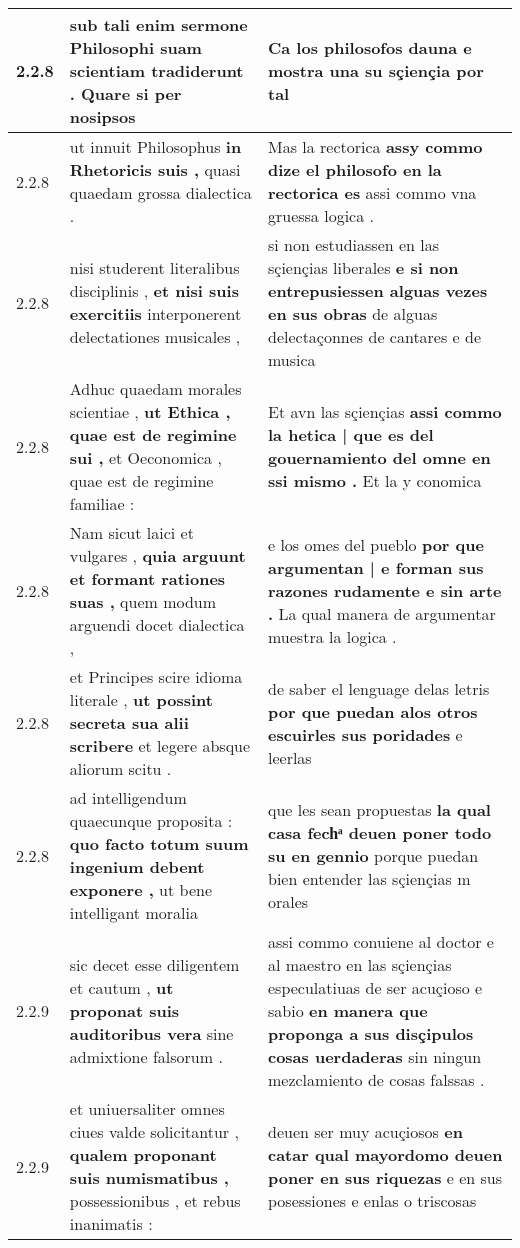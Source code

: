 \begin{tabular}{|p{1cm}|p{6.5cm}|p{6.5cm}|}
2.2.8 & sub tali enim sermone Philosophi \textbf{ suam scientiam tradiderunt . } Quare si per nosipsos & Ca los philosofos dauna \textbf{ e mostra una su sçiençia } por tal \\\hline
2.2.8 & ut innuit Philosophus \textbf{ in Rhetoricis suis , } quasi quaedam grossa dialectica . & Mas la rectorica \textbf{ assy commo dize el philosofo en la rectorica es } assi commo vna gruessa logica . \\\hline
2.2.8 & nisi studerent literalibus disciplinis , \textbf{ et nisi suis exercitiis } interponerent delectationes musicales , & si non estudiassen en las sçiençias liberales \textbf{ e si non entrepusiessen alguas vezes en sus obras } de alguas delectaçonnes de cantares e de musica \\\hline
2.2.8 & Adhuc quaedam morales scientiae , \textbf{ ut Ethica , quae est de regimine sui , } et Oeconomica , quae est de regimine familiae : & Et avn las sçiençias \textbf{ assi commo la hetica | que es del gouernamiento del omne en ssi mismo . } Et la y conomica \\\hline
2.2.8 & Nam sicut laici et vulgares , \textbf{ quia arguunt et formant rationes suas , } quem modum arguendi docet dialectica , & e los omes del pueblo \textbf{ por que argumentan | e forman sus razones rudamente e sin arte . } La qual manera de argumentar muestra la logica . \\\hline
2.2.8 & et Principes scire idioma literale , \textbf{ ut possint secreta sua alii scribere } et legere absque aliorum scitu . & de saber el lenguage delas letris \textbf{ por que puedan alos otros escuirles sus poridades } e leerlas \\\hline
2.2.8 & ad intelligendum quaecunque proposita : \textbf{ quo facto totum suum ingenium debent exponere , } ut bene intelligant moralia & que les sean propuestas \textbf{ la qual casa fechͣ deuen poner todo su en gennio } porque puedan bien entender las sçiençias m orales \\\hline
2.2.9 & sic decet esse diligentem et cautum , \textbf{ ut proponat suis auditoribus vera } sine admixtione falsorum . & assi commo conuiene al doctor e al maestro en las sçiençias especulatiuas de ser acuçioso e sabio \textbf{ en manera que proponga a sus disçipulos cosas uerdaderas } sin ningun mezclamiento de cosas falssas . \\\hline
2.2.9 & et uniuersaliter omnes ciues valde solicitantur , \textbf{ qualem proponant suis numismatibus , } possessionibus , et rebus inanimatis : & deuen ser muy acuçiosos \textbf{ en catar qual mayordomo deuen poner en sus riquezas } e en sus posessiones e enlas o triscosas \\\hline

\end{tabular}
